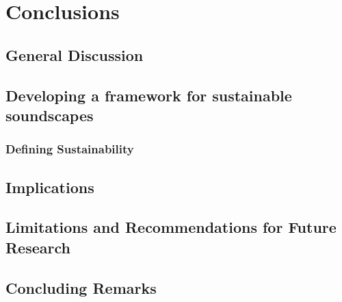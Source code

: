 \chapter{Conclusions}
\label{ch:conc}

\section{General Discussion}



\section{Developing a framework for sustainable soundscapes}

\subsection{Defining Sustainability}



\section{Implications}

\section{Limitations and Recommendations for Future Research}

\section{Concluding Remarks}